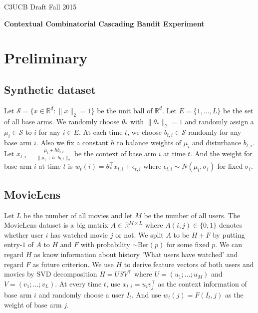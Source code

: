 \documentclass[a4paper,11pt]{article}
\newcommand{\RR}{\mathbb{R}}
\newcommand{\cS}{\mathcal{S}}
\begin{document}
C3UCB Draft \hfill Fall 2015

\vspace*{\baselineskip}

\begin{center}
  \textbf{Contextual Combinatorial Cascading Bandit Experiment}
\end{center}

\vspace*{2\baselineskip}

\section{Preliminary}

\subsection{Synthetic dataset}

Let $\cS = \{x \in \RR^d : \|x\|_2 = 1 \}$ be the unit ball of $\RR^d$. 
Let $E = \{1,...,L\}$ be the set of all base arms. 
We randomly choose $\theta_{\ast}$ with $\|\theta_{\ast}\|_2 = 1$ and randomly assign a $\mu_i \in \cS$ to $i$ for any $i \in E$.
At each time $t$, we choose $b_{t,i} \in \cS$ randomly for any base arm $i$.
Also we fix a constant $h$ to balance weights of $\mu_i$ and disturbance $b_{t,i}$.
Let $x_{t,i} = \frac{\mu_i + h b_{t,i}}{\|\mu_i+h\cdot b_{t,i}\|_2}$ be the context of base arm $i$ at time $t$.
And the weight for base arm $i$ at time $t$ is $w_t(i) = \theta_{\ast}^{\top}x_{t,i} + \epsilon_{t,i}$ where $\epsilon_{t,i} \sim N(\mu_i, \sigma_i)$ for fixed $\sigma_i$.

\subsection{MovieLens}

Let $L$ be the number of all movies and let $M$ be the number of all users. 
The MovieLens dataset is a big matrix $A \in \RR^{M \times L}$ where $A(i,j) \in \{0,1\}$ denotes whether user $i$ has watched movie $j$ or not.
We split $A$ to be $H + F$ by putting entry-$1$ of $A$ to $H$ and $F$ with probability $\sim \mathrm{Ber}(p)$ for some fixed $p$.
We can regard $H$ as know information about history 'What users have watched' and regard $F$ as future criterion.
We use $H$ to derive feature vectors of both users and movies by SVD decomposition $H = USV^{\top}$ where $U = (u_1; ...;u_M)$ and $V = (v_1;...;v_L)$.
At every time $t$, use $x_{t,i} = u_{i}v_j^{\top}$ as the context information of base arm $i$ and randomly choose a user $I_t$.
And use $w_t(j) = F(I_t,j)$ as the weight of base arm $j$.
\end{document}
